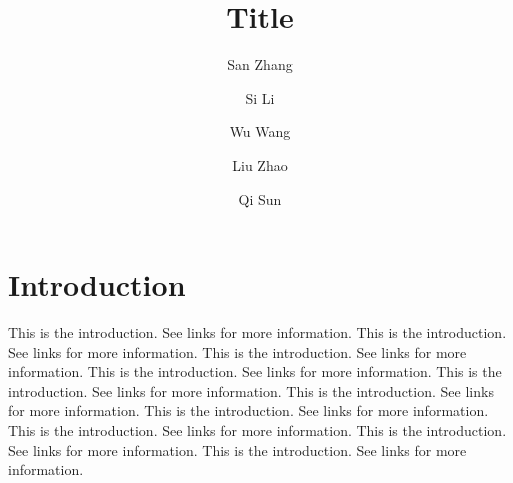 \documentclass[AMA,Times1COL]{WileyNJDv5}
\begin{document}
\title{Title}

\author[1,2,3]{San Zhang}
\author[1,2]{Si Li}
\author[1]{Wu Wang}
\author[1]{Liu Zhao}
\author[1]{Qi Sun}

\address[1]{Affiliation A}
\address[2]{Affiliation B}
\address[3]{Affiliation C}




\maketitle

\renewcommand\thefootnote{}

\renewcommand\thefootnote{\fnsymbol{footnote}}
\setcounter{footnote}{1}

\section{Introduction}
\label{sec:1}

This is the introduction. See links \cite{liu2024efficient, yang2026builder, yang2025checker} for more information. This is the introduction. See links \cite{liu2024efficient, yang2026builder, yang2025checker} for more information. This is the introduction. See links \cite{liu2024efficient, yang2026builder, yang2025checker} for more information. This is the introduction. See links \cite{liu2024efficient, yang2026builder, yang2025checker} for more information. This is the introduction. See links \cite{liu2024efficient, yang2026builder, yang2025checker} for more information. This is the introduction. See links \cite{liu2024efficient, yang2026builder, yang2025checker} for more information. This is the introduction. See links \cite{liu2024efficient, yang2026builder, yang2025checker} for more information. This is the introduction. See links \cite{liu2024efficient, yang2026builder, yang2025checker} for more information. This is the introduction. See links \cite{liu2024efficient, yang2026builder, yang2025checker} for more information. This is the introduction. See links \cite{liu2024efficient, yang2026builder, yang2025checker} for more information. 
\end{document}
